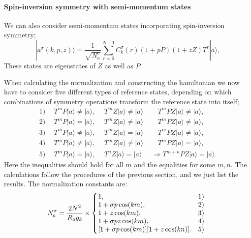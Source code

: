 \documentclass[draft,numberedheadings]{aipproc}
\begin{document}
\paragraph{Spin-inversion symmetry with semi-momentum states}

We can also consider semi-momentum states incorporating spin-inversion symmetry;
\begin{equation}
|a^\sigma(k,p,z)\rangle = \frac{1}{\sqrt{N^\sigma_a}}\sum_{r=0}^{N-1}C^\sigma_k(r)(1  + pP)(1 + zZ)T^r|a\rangle,
\label{akgpzdef}
\end{equation}
These states are eigenstates of $Z$ as well as $P$. 

When calculating the normalization and constructing the hamiltonian we now have to consider five different types of reference states, depending on 
which combinations of symmetry operations transform the reference state into itself;
\begin{equation}
\begin{array}{rrrl}
1)~~ & T^mP|a\rangle \not= |a\rangle,~~& T^{m}Z|a\rangle \not= |a\rangle~~&~~~~ T^{m}PZ|a\rangle \not= |a\rangle,\\
2)~~ & T^mP|a\rangle  = |a\rangle,~~   & T^{m}Z|a\rangle \not= |a\rangle~~&~~~~ T^{m}PZ|a\rangle \not= |a\rangle,\\
3)~~ & T^mP|a\rangle \not= |a\rangle,~~& T^{m}Z|a\rangle = |a\rangle~~      &~~~~ T^{m}PZ|a\rangle \not= |a\rangle,\\
4)~~ & T^mP|a\rangle \not= |a\rangle,~~& T^{m}Z|a\rangle \not= |a\rangle~~     &~~~~T^{m}PZ|a\rangle = |a\rangle,\\
5)~~ & T^mP|a\rangle = |a\rangle,~~    & T^nZ|a\rangle = |a\rangle~~        &\Rightarrow T^{m+n}PZ|a\rangle = |a\rangle.
\end{array} \label{tpzconditions}
\end{equation}
Here the inequalities should hold for all $m$ and the equalities for some $m,n$. The calculations follow the procedures of the previous section, and we just list 
the results. The normalization constants are:
\begin{equation}
N^{\sigma}_a = \frac{2N^2}{R_ag_k} \times
\left \{ \begin{array}{ll} 
\hbox{\hskip-1.5mm} 1,                       & 1) \\
\hbox{\hskip-1.5mm} 1+\sigma p\cos(km),          & 2) \\
\hbox{\hskip-1.5mm} 1+z\cos(km),                 & 3) \\
\hbox{\hskip-1.5mm} 1+\sigma pz\cos(km),        & 4) \\
\hbox{\hskip-1.5mm} [1+\sigma p\cos(km)][1+z\cos(kn)].   & 5)
\end{array}\right.
\label{normkgpz}
\end{equation}
\end{document}
